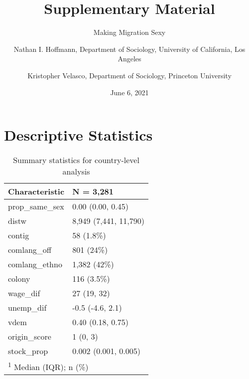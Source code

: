 \documentclass[
  11pt,
]{article}
\title{Supplementary Material}
\subtitle{Making Migration Sexy}
\author{Nathan I. Hoffmann, Department of Sociology, University of California, Los Angeles \and Kristopher Velasco, Department of Sociology, Princeton University}
\date{June 6, 2021}
\begin{document}
\maketitle

{
\hypersetup{linkcolor=}
\setcounter{tocdepth}{2}
\tableofcontents
}
\hypertarget{descriptive-statistics}{%
\section{Descriptive Statistics}\label{descriptive-statistics}}

\begin{table}

\caption{\label{tab:desc-table-country}Summary statistics for country-level analysis}
\centering
\fontsize{8}{10}\selectfont
\begin{tabular}[t]{ll}
\toprule
Characteristic & N = 3,281\\
\midrule
prop\_same\_sex & 0.00 (0.00, 0.45)\\
distw & 8,949 (7,441, 11,790)\\
contig & 58 (1.8\%)\\
comlang\_off & 801 (24\%)\\
comlang\_ethno & 1,382 (42\%)\\
\addlinespace
colony & 116 (3.5\%)\\
wage\_dif & 27 (19, 32)\\
unemp\_dif & -0.5 (-4.6, 2.1)\\
vdem & 0.40 (0.18, 0.75)\\
origin\_score & 1 (0, 3)\\
\addlinespace
stock\_prop & 0.002 (0.001, 0.005)\\
\bottomrule
\multicolumn{2}{l}{\rule{0pt}{1em}\textsuperscript{1} Median (IQR); n (\%)}\\
\end{tabular}
\end{table}
\end{document}
